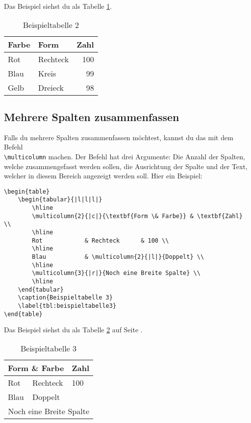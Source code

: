 Das Beispiel siehst du als Tabelle \ref{tbl:beispieltabelle2}.

\begin{table}
	\centering
	\begin{tabular}{|l|l|r|}
		\textbf{Farbe} & \textbf{Form} & \textbf{Zahl} \\
		\hline
		Rot            & Rechteck      & 100 \\
		\hline
		Blau           & Kreis         & 99 \\
		\hline
		Gelb           & Dreieck       & 98 \\
		\hline
	\end{tabular}
	\caption{Beispieltabelle 2}
	\label{tbl:beispieltabelle2}
\end{table}

\subsection{Mehrere Spalten zusammenfassen}

Falls du mehrere Spalten zusammenfassen möchtest, kannst du das mit dem Befehl
\\
 \texttt{\textbackslash multicolumn} machen. Der Befehl hat drei Argumente: Die Anzahl der Spalten, welche zusammengefasst werden sollen, die Ausrichtung der Spalte und der Text, welcher in diesem Bereich angezeigt werden soll. Hier ein Beispiel:

\begin{lstlisting}
\begin{table}
	\begin{tabular}{|l|l|l|}
		\hline
		\multicolumn{2}{|c|}{\textbf{Form \& Farbe}} & \textbf{Zahl} \\
		\hline
		Rot            & Rechteck      & 100 \\
		\hline
		Blau           & \multicolumn{2}{|l|}{Doppelt} \\
		\hline
		\multicolumn{3}{|r|}{Noch eine Breite Spalte} \\
		\hline
	\end{tabular}
	\caption{Beispieltabelle 3}
	\label{tbl:beispieltabelle3}
\end{table}
\end{lstlisting}

Das Beispiel siehst du als Tabelle \ref{tbl:beispieltabelle3} auf Seite \pageref{tbl:beispieltabelle3}.

\begin{table}
	\centering
	\begin{tabular}{|l|l|l|}
		\hline
		\multicolumn{2}{|c|}{\textbf{Form \& Farbe}} & \textbf{Zahl} \\
		\hline
		Rot            & Rechteck      & 100 \\
		\hline
		Blau           & \multicolumn{2}{l|}{Doppelt} \\
		\hline
		\multicolumn{3}{|r|}{Noch eine Breite Spalte} \\
		\hline
	\end{tabular}
	\caption{Beispieltabelle 3}
	\label{tbl:beispieltabelle3}
\end{table}


